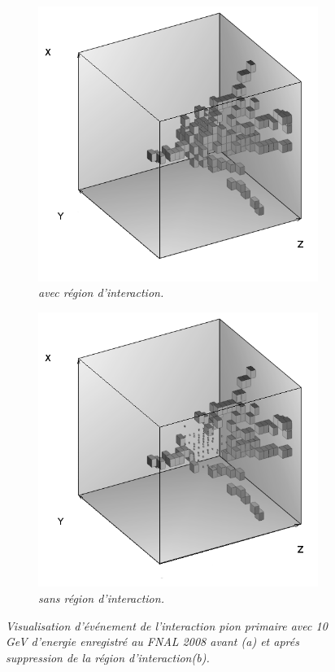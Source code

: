 \begin{figure}
	\centering
	\begin{subfigure}{0.5\textwidth}
		\centering
		\includegraphics[width=.90\linewidth]{ECAL/graphics/before.png}
		\caption{\label{fig:beforeF} \sl avec région d'interaction.}
	\end{subfigure}%
	\begin{subfigure}{0.5\textwidth}
		\centering
		\includegraphics[width=.90\linewidth]{ECAL/graphics/after2.png}
		\caption{\label{fig:afterF} \sl sans région d'interaction.}
	\end{subfigure}
	\caption{ \sl Visualisation d'événement de l'interaction pion primaire avec 10\,GeV d'energie enregistré au FNAL 2008 avant \textit{(a)} et apr\'es suppression de la région d'interaction\textit{(b)}. }
	\label{fig:testF}
\end{figure}


